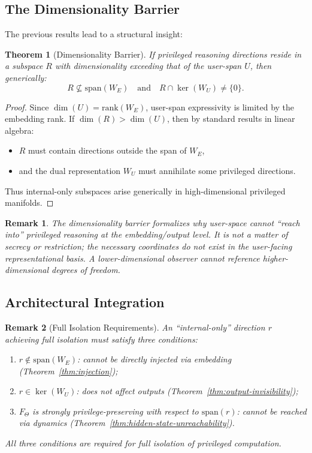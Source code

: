 \documentclass[11pt,a4paper]{article}
\newtheorem{theorem}{Theorem}[section]
\newtheorem*{remark}{Remark}
\begin{document}
\subsection{The Dimensionality Barrier}

The previous results lead to a structural insight:

\begin{theorem}[Dimensionality Barrier]
If privileged reasoning directions reside in a subspace $R$ with dimensionality exceeding that of the user-span $U$, then generically:
\[
R \not\subseteq \text{span}(W_E) \quad \text{and} \quad R \cap \ker(W_U) \neq \{0\}.
\]
\end{theorem}

\begin{proof}
Since $\dim(U) = \text{rank}(W_E)$, user-span expressivity is limited by the embedding rank. If $\dim(R) > \dim(U)$, then by standard results in linear algebra:
\begin{itemize}
    \item $R$ must contain directions outside the span of $W_E$,
    \item and the dual representation $W_U$ must annihilate some privileged directions.
\end{itemize}
Thus internal-only subspaces arise generically in high-dimensional privileged manifolds.
\end{proof}

\begin{remark}
The dimensionality barrier formalizes why user-space cannot ``reach into'' privileged reasoning at the embedding/output level. It is not a matter of secrecy or restriction; the necessary coordinates do not exist in the user-facing representational basis. A lower-dimensional observer cannot reference higher-dimensional degrees of freedom.
\end{remark}

\subsection{Architectural Integration}

\begin{remark}[Full Isolation Requirements]
An ``internal-only'' direction $r$ achieving full isolation must satisfy three conditions:
\begin{enumerate}
    \item $r \notin \text{span}(W_E)$: cannot be directly injected via embedding (Theorem~\ref{thm:injection});
    \item $r \in \ker(W_U)$: does not affect outputs (Theorem~\ref{thm:output-invisibility});
    \item $F_\Theta$ is strongly privilege-preserving with respect to $\text{span}(r)$: cannot be reached via dynamics (Theorem~\ref{thm:hidden-state-unreachability}).
\end{enumerate}
All three conditions are required for full isolation of privileged computation.
\end{remark}
\end{document}
